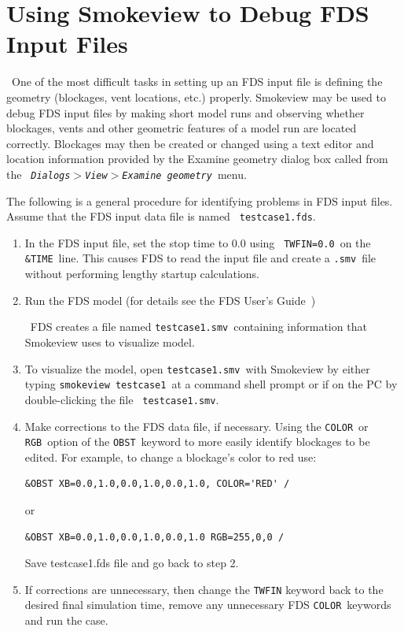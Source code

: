\documentclass[11pt,twoside]{book}
\begin{document}


\chapter{Using Smokeview to Debug FDS Input Files}\ One of the most difficult
tasks in setting up an FDS input file is defining the geometry
(blockages, vent locations, etc.) properly. Smokeview may be used
to debug FDS input files by making short model runs and observing
whether blockages, vents and other geometric features of a model
run are located correctly. Blockages may then be created or
changed using a text editor and location information provided by
the Examine geometry dialog box called from the {\em \tt
Dialogs$>$View$>$Examine geometry}\ menu.

The following is a general procedure for identifying problems in
FDS input files. Assume that the FDS input data file is named {\tt
testcase1.fds}.
\begin{enumerate}
\item In the FDS input file, set the stop time to $0.0$ using {\tt
TWFIN=0.0}\ on the {\tt \&TIME}\ line. This causes FDS to read the
input file and create a {\tt .smv}\ file without  performing
lengthy startup calculations.

\item Run the FDS model (for details see the FDS User's
Guide~\cite{FDS_Users_Guide})

\noindent\ FDS creates a file named {\tt testcase1.smv}\ containing
information that Smokeview uses to visualize model.

\item To visualize the model, open {\tt testcase1.smv}\ with
Smokeview by either typing {\tt smokeview testcase1}\ at a command
shell prompt or if on the PC by double-clicking the file {\tt
testcase1.smv}.

\item Make corrections to the FDS data file, if necessary. Using the {\tt COLOR}\ or {\tt
RGB}\ option of the
{\tt OBST}\ keyword to more easily identify blockages to be edited.
For example, to change a blockage's color to red use:
\begin{lstlisting}
&OBST XB=0.0,1.0,0.0,1.0,0.0,1.0, COLOR='RED' /
\end{lstlisting}
\noindent or
\begin{lstlisting}
&OBST XB=0.0,1.0,0.0,1.0,0.0,1.0 RGB=255,0,0 /
\end{lstlisting}

\noindent Save testcase1.fds file and go back to step 2.

\item If corrections are unnecessary, then change the {\tt TWFIN}
keyword back to the desired final simulation time, remove any
unnecessary FDS {\tt COLOR}\ keywords and run the case.
\end{enumerate}
\end{document}
